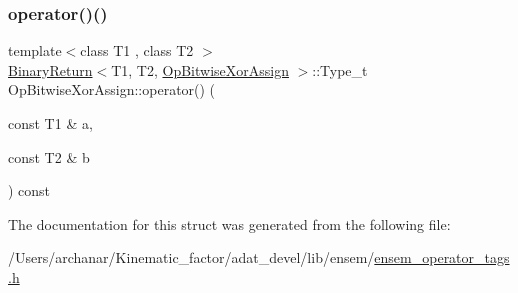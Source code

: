 \mbox{\label{structOpBitwiseXorAssign_a09ad5519029abdca1ad159742ed8ed89}} 
\subsubsection{\texorpdfstring{operator()()}{operator()()}\hspace{0.1cm}{\footnotesize\ttfamily [2/2]}}
{\footnotesize\ttfamily template$<$class T1 , class T2 $>$ \\
\mbox{\hyperlink{structBinaryReturn}{Binary\+Return}}$<$T1, T2, \mbox{\hyperlink{structOpBitwiseXorAssign}{Op\+Bitwise\+Xor\+Assign}} $>$\+::Type\+\_\+t Op\+Bitwise\+Xor\+Assign\+::operator() (\begin{DoxyParamCaption}\item[{const T1 \&}]{a,  }\item[{const T2 \&}]{b }\end{DoxyParamCaption}) const\hspace{0.3cm}{\ttfamily [inline]}}



The documentation for this struct was generated from the following file\+:\begin{DoxyCompactItemize}
\item 
/\+Users/archanar/\+Kinematic\+\_\+factor/adat\+\_\+devel/lib/ensem/\mbox{\hyperlink{lib_2ensem_2ensem__operator__tags_8h}{ensem\+\_\+operator\+\_\+tags.\+h}}\end{DoxyCompactItemize}
